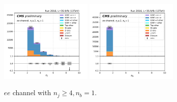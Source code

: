 \begin{figure}[ht]
    \includegraphics[width=0.4\textwidth]{chapters/Analysis/sectionPlots/figures/kinematics_pickles/ee/1b/ee_1b_nJets.pdf}
    \includegraphics[width=0.4\textwidth]{chapters/Analysis/sectionPlots/figures/kinematics_pickles/ee/1b/ee_1b_nBJets.pdf}
    
    \caption{$ee$ channel with $n_j\geq4, n_b=1$.}
\end{figure}

